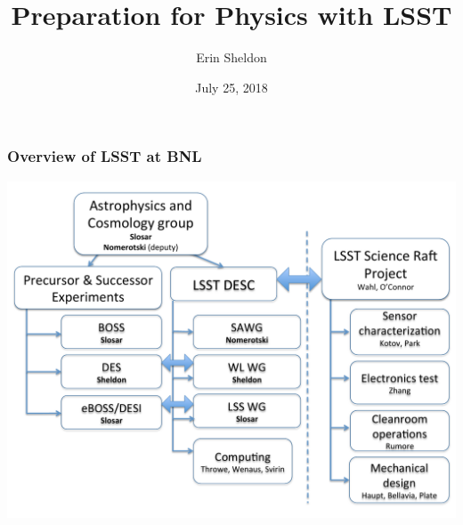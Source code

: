 \documentclass[aspectratio=169]{beamer}
\title{Preparation for Physics with LSST}
\author{Erin Sheldon}
\date{July 25, 2018}
\begin{document}
{
\maketitle
}



\begin{frame}
  \frametitle{Overview of LSST  at BNL}

  \begin{center}
    \includegraphics[height=0.8\textheight]{chart.pdf}
  \end{center}
\end{frame}
\end{document}
